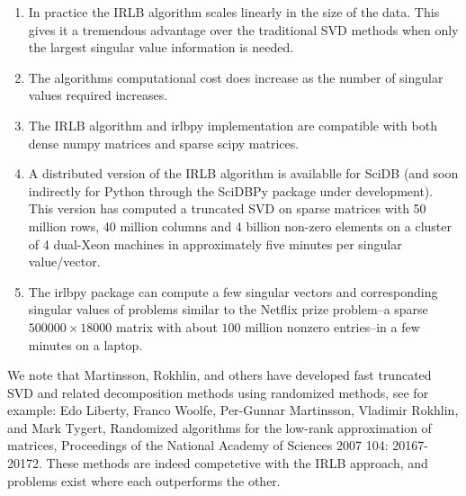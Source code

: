 \documentclass[landscape,a0b,final]{a0poster}
\newenvironment{poster}{
  \begin{center}
  \begin{minipage}[c]{0.98\textwidth}
}{
  \end{minipage} 
  \end{center}
}
\newcommand{\pbox}[4]{
\psshadowbox[#3]{
\begin{minipage}[t][#2][t]{#1}
#4
\end{minipage}
}}
\begin{document}
\begin{poster}
\begin{multicols}{3}
\begin{enumerate}
\item In practice the IRLB algorithm scales linearly in the size of the data.
This gives it a tremendous advantage over the traditional SVD methods when only
the largest singular value information is needed.
\item The algorithms computational cost does increase
as the number of singular values required increases.
\item The IRLB algorithm and irlbpy implementation are compatible with 
both dense numpy matrices and sparse scipy matrices.
\item A distributed version of the IRLB algorithm is availablle
for SciDB \cite{scidb} (and soon indirectly for Python through the
SciDBPy package under development). This version has computed a truncated SVD
on sparse matrices with 50 million rows, 40 million columns and
4 billion non-zero elements on a cluster of 4 dual-Xeon machines
in approximately five minutes per singular value/vector.
\item The irlbpy package can compute a few singular vectors and
corresponding singular values of problems similar to the Netflix
prize problem--a sparse $500000\times18000$ matrix with about $100$ million nonzero entries--in a few minutes on a laptop.
\end{enumerate}

We note that Martinsson, Rokhlin, and others have developed fast truncated
SVD and related decomposition methods using randomized methods, see
for example:
Edo Liberty, Franco Woolfe, Per-Gunnar Martinsson, Vladimir Rokhlin, and Mark Tygert, Randomized algorithms for the low-rank approximation of matrices, Proceedings of the National Academy of Sciences 2007 104: 20167-20172.
These methods are indeed competetive with the IRLB approach, and problems
exist where each outperforms the other. 




\end{multicols}

\vspace{1in}

\begin{multicols}{3}

\vspace{2cm}\begin{center}\pbox{0.8\columnwidth}{}{linewidth=1mm,framearc=0.1,fillstyle=gradient,gradangle=0,gradbegin=white,gradend=white,gradmidpoint=1.0,framesep=1em}{\begin{center}\bf{Dense Matrix Comparison}\end{center}}\end{center}\vspace{1.25cm}


\end{multicols}
\end{poster}
\end{document}
